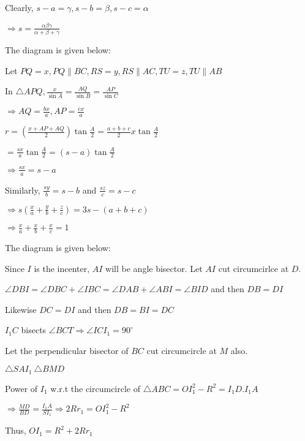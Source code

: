   Clearly, $s - a = \gamma, s - b = \beta, s - c = \alpha$

  $\Rightarrow s = \frac{\alpha\beta\gamma}{\alpha + \beta + \gamma}$

\item The diagram is given below:

  \startplacefigure
    \externalfigure[21_11.pdf]
  \stopplacefigure

  Let $PQ=x, PQ\parallel BC, RS = y, RS\parallel AC, TU = z, TU\parallel AB$

  In $\triangle APQ, \frac{x}{\sin A} = \frac{AQ}{\sin B} = \frac{AP}{\sin C}$

  $\Rightarrow AQ = \frac{bx}{a}, AP = \frac{cx}{a}$

  $r = \left(\frac{x + AP + AQ}{2}\right)\tan\frac{A}{2} = \frac{a + b + c}{2}x\tan\frac{A}{2}$

  $= \frac{sx}{a}\tan\frac{A}{2} = (s - a)\tan\frac{A}{2}$

  $\Rightarrow \frac{sx}{a} = s - a$

  Similarly, $\frac{sy}{b} = s - b$ and $\frac{sz}{c} = s - c$

  $\Rightarrow s\left(\frac{x}{a} + \frac{y}{b} + \frac{z}{c}\right) = 3s - (a + b + c)$

  $\Rightarrow \frac{x}{a} + \frac{x}{b} + \frac{x}{c} = 1$

\item The diagram is given below:

  \startplacefigure
    \externalfigure[21_12.pdf]
  \stopplacefigure

  Since $I$ is the incenter, $AI$ will be angle bisector. Let $AI$ cut circumcirlce at $D.$

  $\angle DBI=\angle DBC+\angle IBC=\angle DAB+\angle ABI=\angle BID$ and then $DB=DI$

  Likewise $DC = DI$ and then $DB = BI = DC$

  $I_1C$ bisects $\angle BCT \Longrightarrow \angle ICI_1 = 90^\circ$

  Let the perpendicular bisector of $BC$ cut circumcircle at $M$ also.

  $\triangle SAI_1 ~ \triangle BMD$

  Power of $I_1$ w.r.t the circumcircle of $\triangle ABC = OI_1^2 - R^2 = I_1D.I_1A$

  $\Rightarrow \frac{MD}{BD} = \frac{I_1A}{SI_1} \Rightarrow 2Rr_1 = OI_1^2 - R^2$

  Thus, $OI_1 = R^2 + 2Rr_1$

